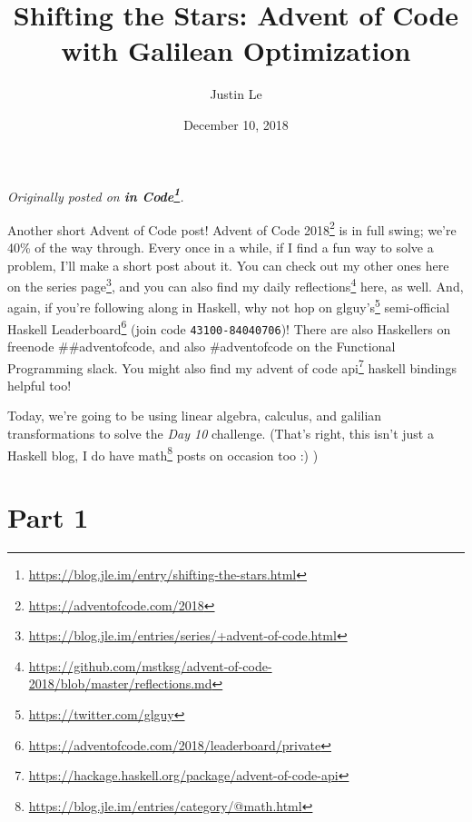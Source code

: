 \documentclass[]{article}
\title{Shifting the Stars: Advent of Code with Galilean Optimization}
\author{Justin Le}
\date{December 10, 2018}
\renewcommand{\href}[2]{#2\footnote{\url{#1}}}
\begin{document}
\maketitle

\emph{Originally posted on
\textbf{\href{https://blog.jle.im/entry/shifting-the-stars.html}{in Code}}.}

Another short Advent of Code post! \href{https://adventofcode.com/2018}{Advent
of Code 2018} is in full swing; we're 40\% of the way through. Every once in a
while, if I find a fun way to solve a problem, I'll make a short post about it.
You can check out my other ones
\href{https://blog.jle.im/entries/series/+advent-of-code.html}{here on the
series page}, and you can also find my
\href{https://github.com/mstksg/advent-of-code-2018/blob/master/reflections.md}{daily
reflections} here, as well. And, again, if you're following along in Haskell,
why not hop on \href{https://twitter.com/glguy}{glguy's} semi-official
\href{https://adventofcode.com/2018/leaderboard/private}{Haskell Leaderboard}
(join code \texttt{43100-84040706})! There are also Haskellers on freenode
\#\#adventofcode, and also \#adventofcode on the Functional Programming slack.
You might also find my
\href{https://hackage.haskell.org/package/advent-of-code-api}{advent of code
api} haskell bindings helpful too!

Today, we're going to be using linear algebra, calculus, and galilian
transformations to solve the \emph{Day 10} challenge. (That's right, this isn't
just a Haskell blog, I do have
\href{https://blog.jle.im/entries/category/@math.html}{math} posts on occasion
too :) )

\hypertarget{part-1}{%
\section{Part 1}\label{part-1}}
\end{document}
